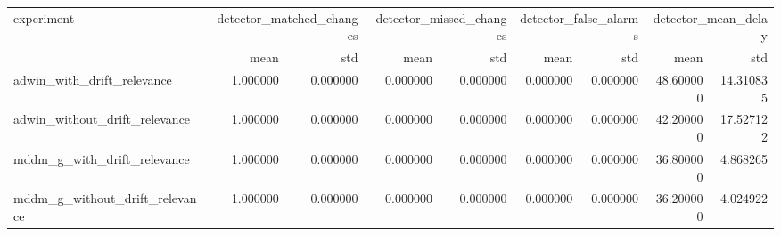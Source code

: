\begin{tabular}{lrrrrrrrr}
\toprule
experiment & \multicolumn{2}{r}{detector\_matched\_changes} & \multicolumn{2}{r}{detector\_missed\_changes} & \multicolumn{2}{r}{detector\_false\_alarms} & \multicolumn{2}{r}{detector\_mean\_delay} \\
 & mean & std & mean & std & mean & std & mean & std \\
\midrule
adwin\_with\_drift\_relevance & 1.000000 & 0.000000 & 0.000000 & 0.000000 & 0.000000 & 0.000000 & 48.600000 & 14.310835 \\
adwin\_without\_drift\_relevance & 1.000000 & 0.000000 & 0.000000 & 0.000000 & 0.000000 & 0.000000 & 42.200000 & 17.527122 \\
mddm\_g\_with\_drift\_relevance & 1.000000 & 0.000000 & 0.000000 & 0.000000 & 0.000000 & 0.000000 & 36.800000 & 4.868265 \\
mddm\_g\_without\_drift\_relevance & 1.000000 & 0.000000 & 0.000000 & 0.000000 & 0.000000 & 0.000000 & 36.200000 & 4.024922 \\
\bottomrule
\end{tabular}
